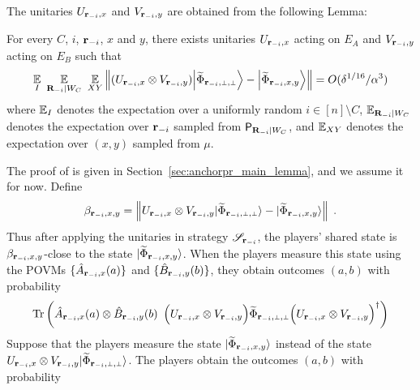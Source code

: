 The unitaries $U_{\mathbf{r}_{-i},x}$ and $V_{\mathbf{r}_{-i},y}$ are obtained from the following Lemma:
\begin{lemma}
\label{lem:local_unitaries}
	For every $C$, $i$, $\mathbf{r}_{-i}$, $x$ and $y$, there exists unitaries $U_{\mathbf{r}_{-i},x}$ acting on $E_A$ and $V_{\mathbf{r}_{-i},y}$ acting on $E_B$ such that
	$$
		\Ex_I \,\, \Ex_{\bR_\mi | W_C} \,\, \Ex_{XY}  \Big \| (U_{\br_\mi,x} \otimes V_{\br_\mi,y}) \bigket{\wt{\Phi}_{\sspp}} - \bigket{\wt{\Phi}_{\ssxy}} \Big\| = O(\delta^{1/16}/\alpha^3)
	$$
	where $\operatorname*{\mathbb{E}}_I$ denotes the expectation over a uniformly random $i \in [n] \setminus C$, $\operatorname*{\mathbb{E}}_{\mathbf{R}_{-i} | W_C}$ denotes the expectation over $\mathbf{r}_{-i}$ sampled from $\mathsf{P}_{\mathbf{R}_{-i} | W_C}$, and $\operatorname*{\mathbb{E}}_{XY}$ denotes the expectation over $(x,y)$ sampled from $\mu$. 
\end{lemma}
The proof of  is given in Section~\ref{sec:anchorpr_main_lemma}, and we assume it for now. Define
\begin{equation}
\label{eq:beta}
\beta_{\br_\mi,x,y} = \left \| U_{\br_\mi,x} \otimes V_{\br_\mi,y} \ket{\wt{\Phi}_\sspp} - \ket{\wt{\Phi}_{\ssxy}} \right \| \;.
\end{equation}
Thus after applying the unitaries in strategy $\mathscr{S}_{\mathbf{r}_{-i}}$, the players' shared state is $\beta_{\mathbf{r}_{-i},x,y}$-close to the state ${|\widetilde{\Phi}_{{\mathbf{r}_{-i} , x,y}}\rangle}$. When the players measure this state using the POVMs $\{\hat{A}_{\mathbf{r}_{-i},x}(a) \}$ and $\{\hat{B}_{\mathbf{r}_{-i}, y}(b)\}$, they obtain outcomes $(a,b)$ with probability
\begin{equation}
\label{eq:anchorpr_main-1}
	\Tr \left ( \what{A}_{\br_\mi, x}(a) \otimes \what{B}_{\br_\mi, y}(b) \,\,\, \Big( U_{\br_\mi,x} \otimes V_{\br_\mi,y} \Big) \wt{\Phi}_{\sspp} \Big( U_{\br_\mi,x} \otimes V_{\br_\mi,y} \Big)^\dagger \right )
\end{equation}
Suppose that the players measure the state ${|\widetilde{\Phi}_{{\mathbf{r}_{-i} , x,y}}\rangle}$ instead of the state $U_{\br_\mi,x} \otimes V_{\br_\mi,y} \ket{\wt{\Phi}_\sspp}$. The players obtain the outcomes $(a,b)$ with probability
